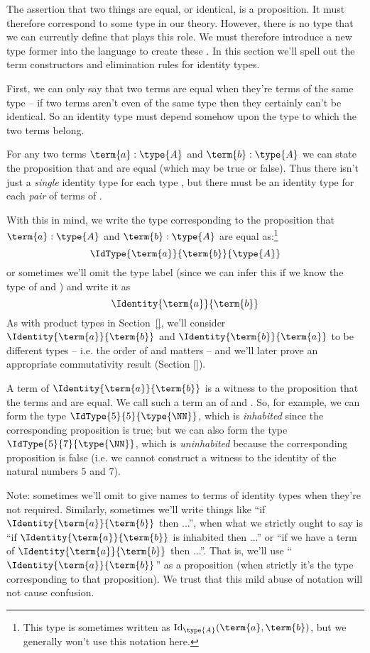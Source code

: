 The assertion that two things are equal, or identical, is a proposition.  It must therefore correspond to some type in our theory.  However, there is no type that we can currently define that plays this role.  We must therefore introduce a new type former into the language to create these .  In this section we'll spell out the term constructors and elimination rules for identity types.  

First, we can only say that two terms are equal when they're terms of the same type -- if two terms aren't even of the same type then they certainly can't be identical.  So an identity type must depend somehow upon the type to which the two terms belong.

For any two terms $\term{a}:\type{A}$ and $\term{b}:\type{A}$ we can state the proposition that  and  are equal (which may be true or false).  Thus there isn't just a \emph{single} identity type for each type , but there must be an identity type for each \emph{pair} of terms of .

With this in mind, we write the type corresponding to the proposition that $\term{a}:\type{A}$ and $\term{b}:\type{A}$ are equal as:\footnote{
This type is sometimes written as 
$\mathrm{Id}_{\type{A}}(\term{a},\term{b})$, 
but we generally won't use this notation here.
}
\[
\IdType{\term{a}}{\term{b}}{\type{A}}
\]
or sometimes we'll omit the type label (since we can infer this if we know the type of  and ) and write it as
\[
\Identity{\term{a}}{\term{b}}
\]
As with product types in Section~\ref{}, we'll consider 
$\Identity{\term{a}}{\term{b}}$
and
$\Identity{\term{b}}{\term{a}}$
to be different types -- i.e. the order of  and  matters -- and we'll later prove an appropriate commutativity result (Section \ref{}).



A term of 
$\Identity{\term{a}}{\term{b}}$ 
is a witness to the proposition that the terms  and  are equal.  We call such a term an  of  and .  
So, for example, we can form the type 
$\IdType{5}{5}{\type{\NN}}$, which is \emph{inhabited} since the corresponding proposition is true; but we can also form the type
$\IdType{5}{7}{\type{\NN}}$, which is \emph{uninhabited} because the corresponding proposition is false (i.e. we cannot construct a witness to the identity of the natural numbers $5$ and $7$).

Note: sometimes we'll omit to give names to terms of identity types when they're not required.  Similarly, sometimes we'll write things like ``if 
$\Identity{\term{a}}{\term{b}}$ 
then ...'', when what we strictly ought to say is 
``if 
$\Identity{\term{a}}{\term{b}}$ is inhabited
then ...''
or
``if we have a term of
$\Identity{\term{a}}{\term{b}}$ 
then ...''.  That is, we'll use ``$\Identity{\term{a}}{\term{b}}$'' as a proposition (when strictly it's the type corresponding to that proposition).
We trust that this mild abuse of notation will not cause confusion.


